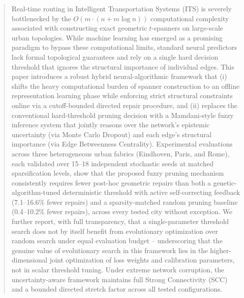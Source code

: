 

\begin{abstract}
Real-time routing in Intelligent Transportation Systems (ITS) is severely bottlenecked by the $O(m \cdot (n + m \log n))$ computational complexity associated with constructing exact geometric $t$-spanners on large-scale urban topologies. While machine learning has emerged as a promising paradigm to bypass these computational limits, standard neural predictors lack formal topological guarantees and rely on a single hard decision threshold that ignores the structural importance of individual edges. This paper introduces a robust hybrid neural-algorithmic framework that (i) shifts the heavy computational burden of spanner construction to an offline representation learning phase while enforcing strict structural constraints online via a cutoff-bounded directed repair procedure, and (ii) replaces the conventional hard-threshold pruning decision with a Mamdani-style fuzzy inference system that jointly reasons over the network's epistemic uncertainty (via Monte Carlo Dropout) and each edge's structural importance (via Edge Betweenness Centrality). Experimental evaluations across three heterogeneous urban fabrics (Eindhoven, Paris, and Rome), each validated over 15--18 independent stochastic seeds at matched sparsification levels, show that the proposed fuzzy pruning mechanism consistently requires fewer post-hoc geometric repairs than both a genetic-algorithm-tuned deterministic threshold with active self-correcting feedback (7.1--16.6\% fewer repairs) and a sparsity-matched random pruning baseline (0.4--10.2\% fewer repairs), across every tested city without exception. We further report, with full transparency, that a single-parameter threshold search does not by itself benefit from evolutionary optimization over random search under equal evaluation budget -- underscoring that the genuine value of evolutionary search in this framework lies in the higher-dimensional joint optimization of loss weights and calibration parameters, not in scalar threshold tuning. Under extreme network corruption, the uncertainty-aware framework maintains full Strong Connectivity (SCC) and a bounded directed stretch factor across all tested configurations.
\end{abstract}


